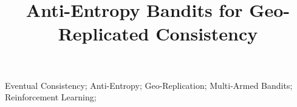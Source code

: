 \documentclass[10pt, conference, compsocconf]{IEEEtran}
\begin{document}
%
\title{\huge Anti-Entropy Bandits for Geo-Replicated Consistency}

\author{
}

\newcommand{\dspace}{\renewcommand{\baselinestretch}{1.02}\Large\normalsize}

\maketitle

\begin{abstract}
    
\end{abstract}

\begin{IEEEkeywords}
Eventual Consistency; Anti-Entropy; Geo-Replication; Multi-Armed Bandits; Reinforcement Learning;
\end{IEEEkeywords}

\dspace





\end{document}
